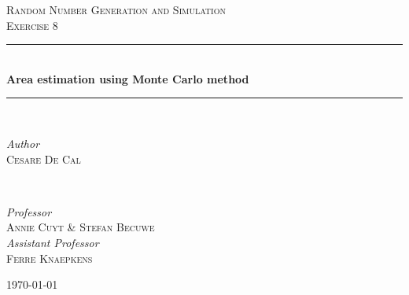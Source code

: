 \documentclass{article}
\begin{document}

\begin{titlepage} %
	\newcommand{\HRule}{\rule{\linewidth}{0.5mm}}%
	
	\center %
	
	
	\textsc{\Large Random Number Generation and Simulation}\\[0.5cm] %
	
	\textsc{\large Exercise 8}\\[0.5cm] %
	
	
	\HRule\\[0.6cm]
	
	{\huge\bfseries Area estimation using Monte Carlo method}\\[0.25cm] %
	
	\HRule\\[1.5cm]
	
	
	\begin{minipage}{0.4\textwidth}
		\begin{flushleft}
			\large
			\textit{Author}\\
			\textsc{Cesare De Cal} %
		\end{flushleft}
	\end{minipage}
	~
	\begin{minipage}{0.4\textwidth}
		\begin{flushright}
			\large
			\textit{Professor}\\
			\textsc{Annie Cuyt \& Stefan Becuwe}\\ %
			[0.25cm]
			\textit{Assistant Professor}\\
			\textsc{Ferre Knaepkens} %

		\end{flushright}
	\end{minipage}
		
	\vfill\vfill\vfill
	
	{\large\today}
		
	\vfill
	
\end{titlepage}
\end{document}
